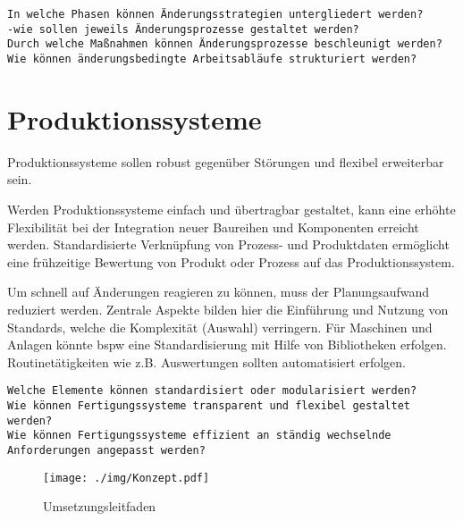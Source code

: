 \begin{verbatim}
In welche Phasen können Änderungsstrategien untergliedert werden?
-wie sollen jeweils Änderungsprozesse gestaltet werden?
Durch welche Maßnahmen können Änderungsprozesse beschleunigt werden?
Wie können änderungsbedingte Arbeitsabläufe strukturiert werden? 
\end{verbatim}

\section{Produktionssysteme}

Produktionssysteme sollen robust gegenüber Störungen und flexibel erweiterbar sein. 

Werden Produktionssysteme einfach und übertragbar gestaltet, kann eine erhöhte Flexibilität bei der Integration neuer Baureihen und Komponenten erreicht werden. Standardisierte Verknüpfung von Prozess- und Produktdaten ermöglicht eine frühzeitige Bewertung von Produkt oder Prozess auf das Produktionssystem. 

Um schnell auf Änderungen reagieren zu können, muss der Planungsaufwand reduziert werden. Zentrale Aspekte bilden hier die Einführung und Nutzung von Standards, welche die Komplexität (Auswahl) verringern. Für Maschinen und Anlagen könnte \gls{bspw} eine Standardisierung mit Hilfe von Bibliotheken erfolgen. Routinetätigkeiten wie z.B. Auswertungen sollten automatisiert erfolgen. 

\begin{verbatim}
Welche Elemente können standardisiert oder modularisiert werden?
Wie können Fertigungssysteme transparent und flexibel gestaltet werden? 
Wie können Fertigungssysteme effizient an ständig wechselnde 
Anforderungen angepasst werden? 
\end{verbatim}


\begin{figure}[ht]
 \centering
 \texttt{[image: ./img/Konzept.pdf]}
 \caption{Umsetzungsleitfaden}
 \label{fig:leitfaden}
\end{figure}
